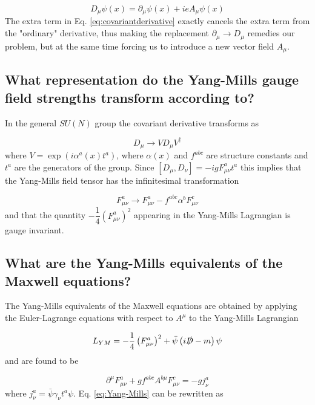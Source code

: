 \documentclass[paper=a4, fontsize=11pt]{scrartcl} %
\numberwithin{equation}{section} %
\numberwithin{figure}{section} %
\numberwithin{table}{section} %
\newcommand{\parentheses}[1]{\ensuremath{\left( #1 \right)}}
\newcommand{\commutator}[1]{\ensuremath{\left[ #1 \right]}}
\begin{document}
\begin{equation}
D_{\mu}\psi(x)= \partial_{\mu}\psi(x)+ieA_{\mu}\psi(x)
\label{eq:covariantderivative}
\end{equation}
The extra term in Eq. \eqref{eq:covariantderivative} exactly cancels the extra term from the "ordinary" derivative, thus making the replacement $\partial_{\mu} \rightarrow D_{\mu}$ remedies our problem, but at the same time forcing us to introduce a new vector field $A_{\mu}$.

\subsection{What representation do the Yang-Mills gauge field strengths transform according to?}
In the general $SU(N)$ group the covariant derivative transforms as

\begin{equation}
D_{\mu} \rightarrow V D_{\mu} V^{\dagger}
\end{equation}
where $V=\exp \parentheses{i\alpha^{a}(x)t^{a}}$, where $\alpha(x)$ and $f^{abc}$ are structure constants and $t^a$ are the generators of the group. Since $\commutator{D_{\mu}, D_{\nu}}=-igF^{a}_{\mu\nu}t^a$ this implies that 
the Yang-Mills field tensor has the infinitesimal transformation

\begin{equation}
F^{a}_{\mu\nu} \rightarrow F^{a}_{\mu\nu} - f^{abc} \alpha^b F^{c}_{\mu\nu}
\end{equation}
and that the quantity $-\dfrac{1}{4}\parentheses{F^{a}_{\mu\nu}}^2$ appearing in the Yang-Mills Lagrangian is gauge invariant.

\subsection{What are the Yang-Mills equivalents of the Maxwell equations?}
The Yang-Mills equivalents of the Maxwell equations are obtained by applying the Euler-Lagrange equations with respect to $A^{\mu}$ to the Yang-Mills Lagrangian

\begin{equation}
L_{YM}=-\dfrac{1}{4}\parentheses{F^{a}_{\mu\nu}}^2+\bar{\psi} \parentheses{i \slashed{D}-m} \psi
\label{eq:Yang-Mills}
\end{equation}
and are found to be

\begin{equation}
\partial^{\mu} F^{a}_{\mu\nu} + g f^{abc} A^{b\mu} F^{c}_{\mu\nu} = -gj^{a}_{\nu}
\end{equation}
where $j^{a}_{\nu}=\bar{\psi} \gamma_{\nu} t^a \psi$. Eq. \eqref{eq:Yang-Mills} can be rewritten as
\end{document}
